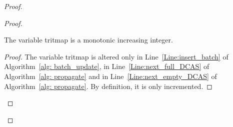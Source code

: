 \begin{proof}
\begin{proof}
\begin{invariant}
The variable tritmap is a monotonic increasing integer.
\end{invariant}
\begin{proof}
The variable tritmap is altered only in Line~\ref{Line:insert_batch} of Algorithm~\ref{alg: batch_update}, in Line~\ref{Line:next_full_DCAS} of Algorithm~\ref{alg: propagate} and in Line~\ref{Line:next_empty_DCAS} of Algorithm~\ref{alg: propagate}. By definition, it is only incremented.
\end{proof}





\end{proof}
\end{proof}
